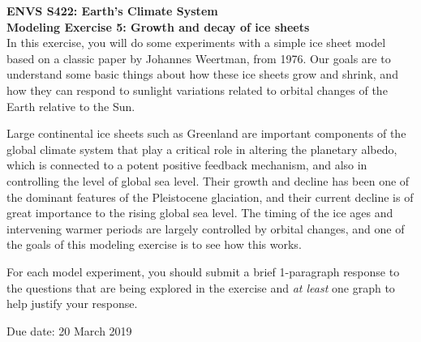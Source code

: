 \documentclass[11pt,letterpaper]{article}
\begin{document}
\setlength{\parindent}{0in}
\newcommand{\tablespace}[0]{\vspace{8pt}}
\textbf{ENVS S422: Earth's Climate System\\
Modeling Exercise 5: Growth and decay of ice sheets}\\%

In this exercise, you will do some experiments with a simple ice sheet model based on a classic paper by Johannes Weertman, from 1976. Our goals are to understand some basic things about how these ice sheets grow and shrink, and how they can respond to sunlight variations related to orbital changes of the Earth relative to the
Sun.


Large continental ice sheets such as Greenland are important components of the global climate system that play a critical role in altering the planetary albedo, which is connected to a potent positive feedback mechanism, and also in controlling the level of global sea level. Their growth and decline has been one of the dominant features of the Pleistocene glaciation, and their current decline is of great importance to the rising global sea level. The timing of the ice ages and intervening warmer periods are largely controlled by orbital changes, and one of the goals of this modeling exercise is to see how this works.

For each model experiment, you should submit a brief 1-paragraph response to the questions that are being explored in the exercise and \textit{at least} one graph to help justify your response.

Due date: 20 March 2019
\end{document}
